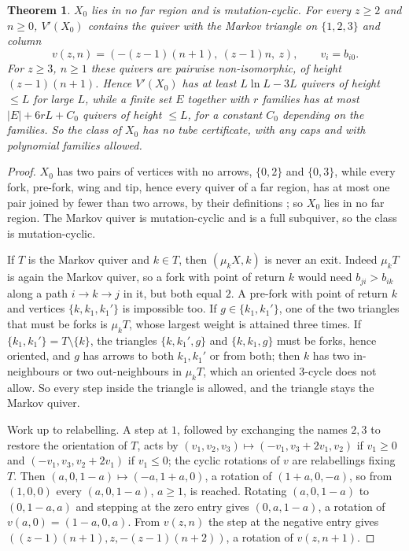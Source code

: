 \documentclass[11pt]{amsart}
\newtheorem{theorem}{Theorem}[section]
\theoremstyle{definition}
\theoremstyle{remark}
\newcommand{\Vp}{V'}
\begin{document}
\begin{theorem}\label{thm:markov}
$X_0$ lies in no far region and is mutation-cyclic. For every $z\ge2$ and $n\ge0$, $\Vp(X_0)$ contains the quiver with the Markov triangle on $\{1,2,3\}$ and column
\[v(z,n)=(-(z-1)(n+1),\ (z-1)n,\ z),\qquad v_i=b_{i0}.\]
For $z\ge3$, $n\ge1$ these quivers are pairwise non-isomorphic, of height $(z-1)(n+1)$. Hence $\Vp(X_0)$ has at least $L\ln L-3L$ quivers of height $\le L$ for large $L$, while a finite set $E$ together with $r$ families has at most $|E|+6rL+C_0$ quivers of height $\le L$, for a constant $C_0$ depending on the families. So the class of $X_0$ has no tube certificate, with any caps and with polynomial families allowed.
\end{theorem}
\begin{proof}
$X_0$ has two pairs of vertices with no arrows, $\{0,2\}$ and $\{0,3\}$, while every fork, pre-fork, wing and tip, hence every quiver of a far region, has at most one pair joined by fewer than two arrows, by their definitions \cite[Defs.~2.5, 4.5, 4.14, 4.18]{Erv}; so $X_0$ lies in no far region. The Markov quiver is mutation-cyclic and is a full subquiver, so the class is mutation-cyclic.

If $T$ is the Markov quiver and $k\in T$, then $(\mu_kX,k)$ is never an exit. Indeed $\mu_kT$ is again the Markov quiver, so a fork with point of return $k$ would need $b_{ji}>b_{ik}$ along a path $i\to k\to j$ in it, but both equal $2$. A pre-fork with point of return $k$ and vertices $\{k,k_1,k_1'\}$ is impossible too. If $g\in\{k_1,k_1'\}$, one of the two triangles that must be forks is $\mu_kT$, whose largest weight is attained three times. If $\{k_1,k_1'\}=T\setminus\{k\}$, the triangles $\{k,k_1',g\}$ and $\{k,k_1,g\}$ must be forks, hence oriented, and $g$ has arrows to both $k_1,k_1'$ or from both; then $k$ has two in-neighbours or two out-neighbours in $\mu_kT$, which an oriented $3$-cycle does not allow. So every step inside the triangle is allowed, and the triangle stays the Markov quiver.

Work up to relabelling. A step at $1$, followed by exchanging the names $2,3$ to restore the orientation of $T$, acts by $(v_1,v_2,v_3)\mapsto(-v_1,v_3+2v_1,v_2)$ if $v_1\ge0$ and $(-v_1,v_3,v_2+2v_1)$ if $v_1\le0$; the cyclic rotations of $v$ are relabellings fixing $T$. Then $(a,0,1-a)\mapsto(-a,1+a,0)$, a rotation of $(1+a,0,-a)$, so from $(1,0,0)$ every $(a,0,1-a)$, $a\ge1$, is reached. Rotating $(a,0,1-a)$ to $(0,1-a,a)$ and stepping at the zero entry gives $(0,a,1-a)$, a rotation of $v(a,0)=(1-a,0,a)$. From $v(z,n)$ the step at the negative entry gives $((z-1)(n+1),z,-(z-1)(n+2))$, a rotation of $v(z,n+1)$.


\end{proof}
\end{document}
